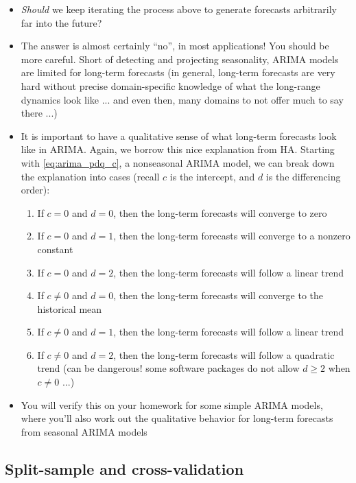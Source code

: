 \documentclass{article}
\begin{document}
\begin{itemize}
\item \emph{Should} we keep iterating the process above to generate forecasts
  arbitrarily far into the future? 

\item The answer is almost certainly ``no'', in most applications! You should 
  be more careful. Short of detecting and projecting seasonality, ARIMA models
  are limited for long-term forecasts (in general, long-term forecasts are very
  hard without precise domain-specific knowledge of what the long-range dynamics
  look like ... and even then, many domains to not offer much to say there ...)  

\item It is important to have a qualitative sense of what long-term forecasts
  look like in ARIMA. Again, we borrow this nice explanation from HA. Starting
  with \eqref{eq:arima_pdq_c}, a nonseasonal ARIMA model, we can break down the
  explanation into cases (recall $c$ is the intercept, and $d$ is the
  differencing order):  

\begin{enumerate}
\item If $c = 0$ and $d = 0$, then the long-term forecasts will converge
  to zero 
\item If $c = 0$ and $d = 1$, then the long-term forecasts will converge
  to a nonzero constant 
\item If $c = 0$ and $d = 2$, then the long-term forecasts will follow a
  linear trend
\item  If $c \not= 0$ and $d = 0$, then the long-term forecasts will
  converge to the historical mean 
\item  If $c \not= 0$ and $d = 1$, then the long-term forecasts will
  follow a linear trend
\item  If $c \not= 0$ and $d = 2$, then the long-term forecasts will
  follow a quadratic trend (can be dangerous! some software packages do not
  allow $d \geq 2$ when $c \not= 0$ ...)
\end{enumerate}

\item You will verify this on your homework for some simple ARIMA models, where
  you'll also work out the qualitative behavior for long-term forecasts from
  seasonal ARIMA models 
\end{itemize}

\subsection{Split-sample and cross-validation}
\end{document}
